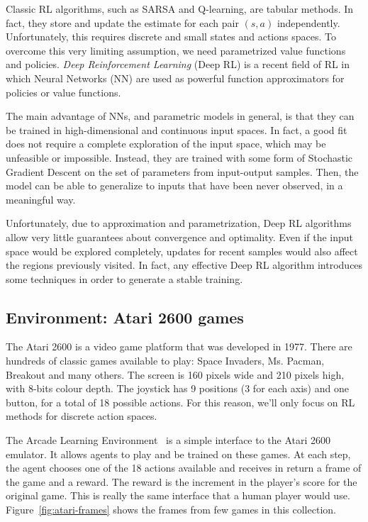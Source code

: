 Classic RL algorithms, such as SARSA and Q-learning, are tabular methods.
In fact, they store and update the estimate for each pair $(s, a)$
independently. Unfortunately, this requires discrete and small states and
actions spaces. To overcome this very limiting assumption, we need
parametrized value functions and policies.  \emph{Deep Reinforcement Learning}
(Deep RL) is a recent field of RL in which Neural Networks
(NN) are used as powerful function
approximators for policies or value functions.

The main advantage of NNs, and parametric models in general, is that they can
be trained in high-dimensional and continuous input spaces. In fact, a good
fit does not require a complete exploration of the input space, which may be
unfeasible or impossible. Instead, they are trained with some form of
Stochastic Gradient Descent on the set of parameters from input-output
samples. Then, the model can be able to generalize to inputs that have been
never observed, in a meaningful way.

Unfortunately, due to approximation and parametrization, Deep RL algorithms
allow very little guarantees about convergence and optimality. Even if the
input space would be explored completely, updates for recent samples would
also affect the regions previously visited. In fact, any effective Deep RL
algorithm introduces some techniques in order to generate a stable training.


\subsection{Environment: Atari 2600 games}

The Atari 2600 is a video game platform that was developed in 1977. There are
hundreds of classic games available to play: Space Invaders, Ms. Pacman,
Breakout and many others. The screen is 160 pixels wide and 210 pixels high,
with 8-bits colour depth. The joystick has 9 positions (3 for each axis) and
one button, for a total of 18 possible actions. For this reason, we'll only
focus on RL methods for discrete action spaces.

The Arcade Learning Environment~\cite{bib:atari-games} is a simple interface
to the Atari 2600 emulator. It allows agents to play and be trained on these
games. At each step, the agent chooses one of the 18 actions available and
receives in return a frame of the game and a reward. The reward is the
increment in the player's score for the original game. This is really the same
interface that a human player would use. Figure~\ref{fig:atari-frames} shows
the frames from few games in this collection. 


